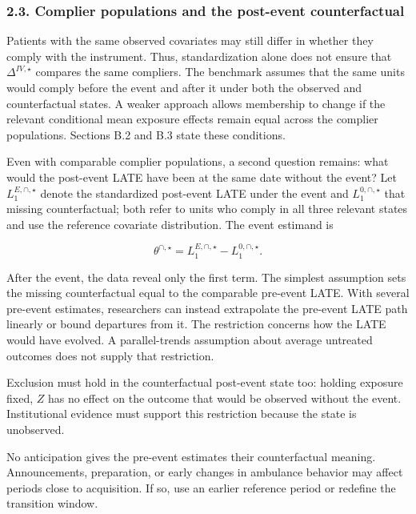 \documentclass[
  11pt,
]{article}
\begin{document}
\hypertarget{complier-populations-and-the-post-event-counterfactual}{%
\subsubsection{2.3. Complier populations and the post-event
counterfactual}\label{complier-populations-and-the-post-event-counterfactual}}

Patients with the same observed covariates may still differ in whether
they comply with the instrument. Thus, standardization alone does not
ensure that \(\Delta^{IV,\star}\) compares the same compliers. The
benchmark assumes that the same units would comply before the event and
after it under both the observed and counterfactual states. A weaker
approach allows membership to change if the relevant conditional mean
exposure effects remain equal across the complier populations. Sections
B.2 and B.3 state these conditions.

Even with comparable complier populations, a second question remains:
what would the post-event LATE have been at the same date without the
event? Let \(L_1^{E,\cap,\star}\) denote the standardized post-event
LATE under the event and \(L_1^{0,\cap,\star}\) that missing
counterfactual; both refer to units who comply in all three relevant
states and use the reference covariate distribution. The event estimand
is

\[
\theta^{\cap,\star}=L_1^{E,\cap,\star}-L_1^{0,\cap,\star}.
\tag{3}
\]

After the event, the data reveal only the first term. The simplest
assumption sets the missing counterfactual equal to the comparable
pre-event LATE. With several pre-event estimates, researchers can
instead extrapolate the pre-event LATE path linearly or bound departures
from it. The restriction concerns how the LATE would have evolved. A
parallel-trends assumption about average untreated outcomes does not
supply that restriction.

Exclusion must hold in the counterfactual post-event state too: holding
exposure fixed, \(Z\) has no effect on the outcome that would be
observed without the event. Institutional evidence must support this
restriction because the state is unobserved.

No anticipation gives the pre-event estimates their counterfactual
meaning. Announcements, preparation, or early changes in ambulance
behavior may affect periods close to acquisition. If so, use an earlier
reference period or redefine the transition window.
\end{document}
